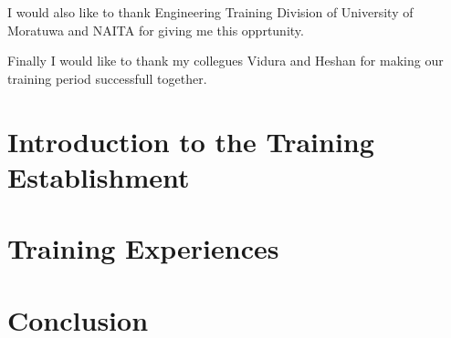 \documentclass[12pt]{report}
\begin{document}
I would also like to thank Engineering Training Division of University of Moratuwa and NAITA for giving me this opprtunity.

Finally I would like to thank my collegues Vidura and Heshan for making our training period successfull together.

\tableofcontents

\listoffigures

\listoftables

\newpage
\renewcommand{\thepage}{\arabic{page}} %
\setcounter{page}{1} %
\chapter{Introduction to the Training Establishment}


\chapter{Training Experiences}


\chapter{Conclusion}

\end{document}
